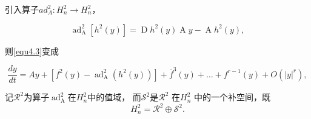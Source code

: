 引入算子$a d _ { A } ^ { 2 } : H _ { n } ^ { 2 } \rightarrow H _ { n } ^ { 2 }$，

\begin{equation}
\operatorname { ad } _ { \operatorname A } ^ { 2 } \left[ h ^ { 2 } ( y ) \right] = \operatorname { D } h ^ { 2 } ( y ) \operatorname A { y } - \operatorname A h ^ { 2 } ( y ),
\label{eq:1.4.4}
\end{equation}

则\ref{equ4.3}变成

\begin{equation}
\frac { d y } { d t } = A y + \left[ f ^ { 2 } ( y ) - \operatorname { ad } _{\operatorname A}^2 \left( h ^ { 2 } ( y ) \right) \right] + \overline { f } ^ { 3 } ( y ) +\dots + f ^ { r - 1 } ( y ) + O \left( | y | ^ { r } \right),
  \label{eq:1.4.5}
\end{equation}

记$\mathscr { R } ^ { 2 }$为算子$\operatorname { ad } _ { \operatorname { A } } ^ { 2 }$在$H _ { n } ^ { 2 }$中的值域，
而$\mathscr{S}^2$是\(\mathscr{R}^2\) 在\(H_n^2\) 中的一个补空间，既
\[
H _ { n } ^ { 2 } = \mathscr { R } ^ { 2 } \oplus \mathscr { S }^2.
\]

